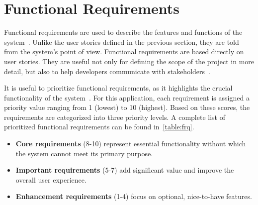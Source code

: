\documentclass{ctuthesis}
\begin{document}
\section{Functional Requirements}
Functional requirements are used to describe the features and functions of the system~\cite{FR1}. Unlike the user stories defined in the previous section, they are told from the system's point of view. Functional requirements are based directly on user stories. They are useful not only for defining the scope of the project in more detail, but also to help developers communicate with stakeholders~\cite{FR2}.

It is useful to prioritize functional requirements, as it highlights the crucial functionality of the system~\cite{FR2}. For this application, each requirement is assigned a priority value ranging from 1 (lowest) to 10 (highest). Based on these scores, the requirements are categorized into three priority levels. A complete list of prioritized functional requirements can be found in~\autoref{table:frq}.

\begin{itemize}
    \item \textbf{Core requirements} (8-10) represent essential functionality without which the system cannot meet its primary purpose.
    \item \textbf{Important requirements} (5-7) add significant value and improve the overall user experience. 
    \item \textbf{Enhancement requirements} (1-4) focus on optional, nice-to-have features.
\end{itemize}
\end{document}
